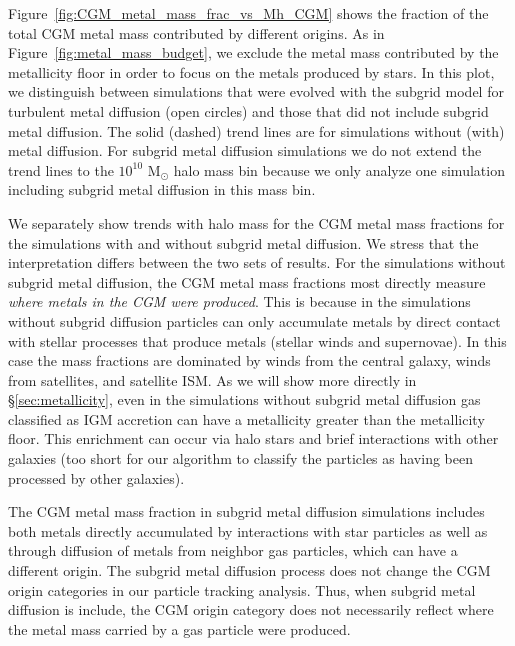 \documentclass[fleqn,usenatbib]{mnras}
\begin{document}
Figure~\ref{fig:CGM_metal_mass_frac_vs_Mh_CGM} shows the fraction of the total CGM metal mass contributed by different origins.
As in  Figure~\ref{fig:metal_mass_budget}, we exclude the metal mass contributed by the metallicity floor in order to focus on the metals produced by stars. 
In this plot, we distinguish between simulations that were evolved with the subgrid model for turbulent metal diffusion (open circles) and those that did not include subgrid metal diffusion. 
The solid (dashed) trend lines are for simulations without (with) metal diffusion.
For subgrid metal diffusion simulations we do not extend the trend lines to the $10^{10}$ M$_{\odot}$ halo mass bin because we only analyze one simulation including subgrid metal diffusion in this mass bin. 

We separately show trends with halo mass for the CGM metal mass fractions for the simulations with and without subgrid metal diffusion. 
We stress that the interpretation differs between the two sets of results.
For the simulations without subgrid metal diffusion, the CGM metal mass fractions most directly measure \emph{where metals in the CGM were produced}. 
This is because in the simulations without subgrid diffusion particles can only accumulate metals by direct contact with stellar processes that produce metals (stellar winds and supernovae).
In this case the mass fractions are dominated by winds from the central galaxy, winds from satellites, and satellite ISM. 
As we will show more directly in \S \ref{sec:metallicity}, even in the simulations without subgrid metal diffusion gas classified as IGM accretion can have a metallicity greater than the metallicity floor. 
This enrichment can occur via halo stars and brief interactions with other galaxies (too short for our algorithm to classify the particles as having been processed by other galaxies).

The CGM metal mass fraction in subgrid metal diffusion simulations includes both metals directly accumulated by interactions with star particles as well as through diffusion of metals from neighbor gas particles, which can have a different origin. 
The subgrid metal diffusion process does not change the CGM origin categories in our particle tracking analysis. 
Thus, when subgrid metal diffusion is include, the CGM origin category does not necessarily reflect where the metal mass carried by a gas particle were produced.
\end{document}
